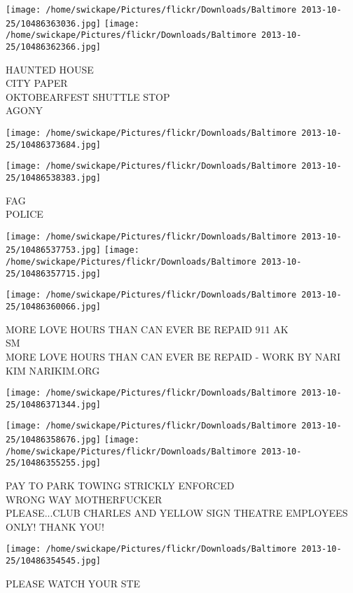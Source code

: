 \documentclass[10pt,letterpaper]{article}
\begin{document}
\texttt{[image: /home/swickape/Pictures/flickr/Downloads/Baltimore 2013-10-25/10486363036.jpg]}
\texttt{[image: /home/swickape/Pictures/flickr/Downloads/Baltimore 2013-10-25/10486362366.jpg]}

HAUNTED HOUSE\\
CITY PAPER\\
OKTOBEARFEST SHUTTLE STOP\\
AGONY\\
\pagebreak

\texttt{[image: /home/swickape/Pictures/flickr/Downloads/Baltimore 2013-10-25/10486373684.jpg]}

\vspace{0.25in}
\texttt{[image: /home/swickape/Pictures/flickr/Downloads/Baltimore 2013-10-25/10486538383.jpg]}

FAG\\
POLICE\\
\pagebreak

\texttt{[image: /home/swickape/Pictures/flickr/Downloads/Baltimore 2013-10-25/10486537753.jpg]}
\texttt{[image: /home/swickape/Pictures/flickr/Downloads/Baltimore 2013-10-25/10486357715.jpg]}

\texttt{[image: /home/swickape/Pictures/flickr/Downloads/Baltimore 2013-10-25/10486360066.jpg]}

MORE LOVE HOURS THAN CAN EVER BE REPAID 911 AK\\
SM\\
MORE LOVE HOURS THAN CAN EVER BE REPAID {-} WORK BY NARI KIM NARIKIM.ORG\\
\pagebreak

\texttt{[image: /home/swickape/Pictures/flickr/Downloads/Baltimore 2013-10-25/10486371344.jpg]}

\vspace{0.25in}
\texttt{[image: /home/swickape/Pictures/flickr/Downloads/Baltimore 2013-10-25/10486358676.jpg]}
\texttt{[image: /home/swickape/Pictures/flickr/Downloads/Baltimore 2013-10-25/10486355255.jpg]}

PAY TO PARK TOWING STRICKLY ENFORCED\\
WRONG WAY MOTHERFUCKER\\
PLEASE...CLUB CHARLES AND YELLOW SIGN THEATRE EMPLOYEES ONLY!  THANK YOU!\\
\pagebreak

\texttt{[image: /home/swickape/Pictures/flickr/Downloads/Baltimore 2013-10-25/10486354545.jpg]}

PLEASE WATCH YOUR STE\\
\pagebreak
\end{document}
